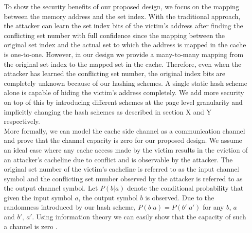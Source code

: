 To show the security benefits of our proposed design, we focus on the mapping between the memory address and the set index. With the traditional approach, the attacker can learn the set index bits of the victim's address after finding the conflicting set number with full confidence since the mapping between the original set index and the actual set to which the address is mapped in the cache is one-to-one. However, in our design we provide a many-to-many mapping from the original set index to the mapped set in the cache. Therefore, even when the attacker has learned the conflicting set number, the original index bits are completely unknown because of our hashing schemes. A single static hash scheme alone is capable of hiding the victim's address completely. We add more security on top of this by introducing different schemes at the page level granularity and implicitly changing the hash schemes as described in section X and Y respectively. \\
More formally, we can model the cache side channel as a communication channel and prove that the channel capacity is zero for our proposed design. We assume an ideal case where any cache access made by the victim results in the eviction of an attacker's cacheline due to conflict and is observable by the attacker. The original set number of the victim's cacheline is referred to as the input channel symbol and the conflicting set number observed by the attacker is referred to as the output channel symbol. Let $P(b|a)$ denote the conditional probability that given the input symbol $a$, the output symbol $b$ is observed. Due to the randomness introduced by our hash scheme, $P(b|a) = P(b'|a')$ for any $b$, $a$ and $b'$, $a'$. Using information theory we can easily show that the capacity of such a channel is zero \cite{info_theory}.
